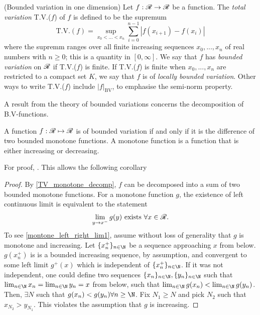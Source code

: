 \begin{definition}(Bounded variation in one dimension) \label{def:bounded_variation}
Let $f : \mathscr{R} \rightarrow \mathscr{R}$ be a function. The \emph{total variation} T.V.($f$) of $f$ is defined to be the supremum
\begin{equation} \label{TV_1d}
	\text{T.V.}(f) = \sup_{x_0 < ... < x_n} \sum_{i = 0}^{n-1} \left| f(x_{i+1}) - f(x_i)\right|
\end{equation} 
where the supremm ranges over all finite increasing sequences $x_0, ..., x_n$ of real numbers with $n \geq 0$; this is a quantity in $[0, \infty]$. We say that $f$ has \emph{bounded variation} on $\mathscr{R}$ if T.V.($f$) is finite. If T.V.($f$) is finite when $x_0, ..., x_n$ are restricted to a compact set $K$, we say that $f$ is of \emph{locally bounded variation}. Other ways to write T.V.($f$) include $\left|f\right|_{\text{BV}}$, to emphasise the semi-norm property. %
%

A result from the theory of bounded variations concerns the decomposition of B.V-functions. 

\begin{proposition} \label{TV_monotone_decomp}
	A function $f : \R \mapsto \R$ is of bounded variation if and only if it is the difference of two bounded monotone functions. A monotone function is a function that is either increasing or decreasing.
\end{proposition}
For proof, \cite[see][p.166]{tao2011introduction}.
This allows the following corollary
\begin{corollary}
	Any function $f : \R \mapsto \R$ of bounded variation has a left- continuous version $\tilde{f}}$ such that 
	\begin{equation}
		\text{T.V.}(f) = \text{T.V.}(\tilde{f})
	\end{equation}
\end{corollary}
\begin{proof}
	By \eqref{TV_monotone_decomp}, $f$ can be decomposed into a sum of two bounded monotone functions. For a monotone function $g$, the existence of left continuous limit is equivalent to the statement
	\begin{align}
		\lim_{y \rightarrow x^-} g(y) \text{ exists } \forall x \in \R.  \label{montone_left_right_lim1} 
	\end{align}
	 To see \eqref{montone_left_right_lim1}, assume without loss of generality that $g$ is monotone and increasing. Let $\{x_n^+\}_{n \in \N}$ be a sequence approaching $x$ from below. $g(x_n^+)$ is is a bounded increasing sequence, by assumption, and  convergent to some left limit $g^+(x)$ which is independent of  $\{x_n^+\}_{n \in \N}$. If it was not independent, one could define two sequences $\{x_n\}_{n \in \N}, \{y_n\}_{n \in \N}$ such that $\lim_{n \in \N} x_n = \lim_{n \in \N} y_n = x$ from below,  such that $\lim_{n \in \N} g(x_n) < \lim_{n \in \N} g(y_n)$. Then, $\exists N$ such that $ g(x_n) < g(y_n) \forall n \geq \N$. Fix $N_1 \geq N$ and pick $N_2$ such that $x_{N_2} > y_{N_1}$. This violates the assumption that $g$ is increasing.
	 

\end{proof}
\end{definition}
